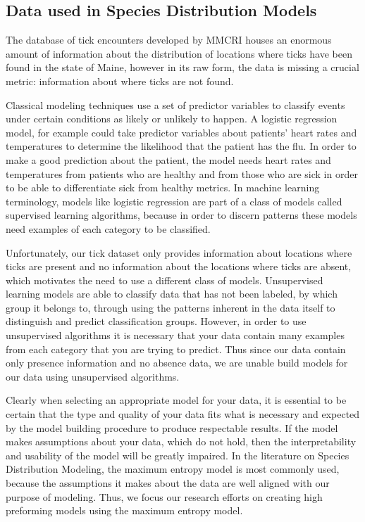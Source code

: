 \subsection{Data used in Species Distribution Models}
\noindent The database of tick encounters developed by MMCRI houses an enormous amount of information about the distribution of locations where ticks have been found in the state of Maine, however in its raw form, the data is missing a crucial metric: information about where ticks are not found. \newline

\noindent Classical modeling techniques use a set of predictor variables to classify events under certain conditions as likely or unlikely to happen. A logistic regression model, for example could take predictor variables about patients' heart rates and temperatures to determine the likelihood that the patient has the flu. In order to make a good prediction about the patient, the model needs heart rates and temperatures from patients who are healthy and from those who are sick in order to be able to differentiate sick from healthy metrics. In machine learning terminology, models like logistic regression are part of a class of models called supervised learning algorithms, because in order to discern patterns these models need examples of each category to be classified. \newline

\noindent Unfortunately, our tick dataset only provides information about locations where ticks are present and no information about the locations where ticks are absent, which motivates the need to use a different class of models. Unsupervised learning models are able to classify data that has not been labeled, by which group it belongs to, through using the patterns inherent in the data itself to distinguish and predict classification groups. However, in order to use unsupervised algorithms it is necessary that your data contain many examples from each category that you are trying to predict. Thus since our data contain only presence information and no absence data, we are unable build models for our data using unsupervised algorithms. \newline

\noindent Clearly when selecting an appropriate model for your data, it is essential to be certain that the type and quality of your data fits what is necessary and expected by the model building procedure to produce respectable results. If the model makes assumptions about your data, which do not hold, then the interpretability and usability of the model will be greatly impaired. In the literature on Species Distribution Modeling, the maximum entropy model is most commonly used, because the assumptions it makes about the data are well aligned with our purpose of modeling. Thus, we focus our research efforts on creating high preforming models using the maximum entropy model. \newline

